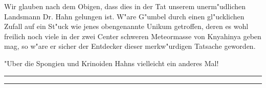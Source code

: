 \documentclass[a4paper, 12pt, oneside]{article}
\begin{document}
Wir glauben nach dem Obigen, dass dies in der Tat unserem unerm"udlichen Landsmann Dr. Hahn gelungen ist. W"are G"umbel durch einen gl"ucklichen Zufall auf ein St"uck wie jenes obengenannte Unikum getroffen, deren es wohl freilich noch viele in der zwei Center schweren Meteormasse von Knyahinya geben mag, so w"are er sicher der Entdecker dieser merkw"urdigen Tatsache geworden.

"Uber die Spongien und Krinoiden Hahns vielleicht ein anderes Mal!
\rule{\textwidth}{1.6pt}\vspace*{-\baselineskip}\vspace*{2pt} %
\rule{\textwidth}{0.4pt} %
\paragraph{}
\end{document}
